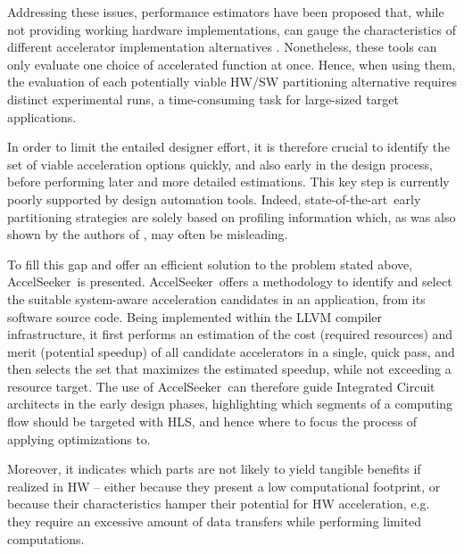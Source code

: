 \documentclass[]{usiinfthesis}
\newcommand{\aseeker}{{AccelSeeker}}
\newcommand{\SoTA}{{state-of-the-art}}
\begin{document}
Addressing these issues, performance estimators have been proposed
that, while not providing working hardware implementations, can gauge
the characteristics of different accelerator implementation
alternatives  \cite{ShaoOct16} \cite{KathailFeb16}.  
Nonetheless, these tools can only evaluate one choice of accelerated
function at once. Hence, when using them, the evaluation of each
potentially viable HW/SW partitioning alternative requires
distinct experimental runs, a time-consuming task for large-sized
target applications.\par

In order to limit the entailed designer effort, it is therefore crucial to identify the set of viable 
acceleration options quickly, and also early in the design process, before performing later and more 
detailed estimations. This key step is currently poorly supported by design automation tools. Indeed, 
\SoTA\ early partitioning strategies are solely based on profiling information \cite{XilinxESTRef18} 
\cite{LattnerMar04} which, as was also shown by the authors of \cite{SyrowikJun18}, may often be 
misleading.\par

To fill this gap and offer an efficient solution to the problem stated above, \aseeker\ is presented. 
\aseeker\ offers a methodology to identify and select the suitable system-aware acceleration candidates in an
application, from its software source code. Being implemented within the LLVM \cite{LattnerMar04} compiler 
infrastructure, it first performs an estimation of the cost (required resources) and merit (potential speedup) 
of all candidate accelerators in a single, quick pass, and then selects the set that maximizes the estimated 
speedup, while not exceeding a resource target. The use of \aseeker\ can therefore guide Integrated Circuit 
architects in the early design phases, highlighting which segments of a computing flow should be
targeted with HLS, and hence where to focus the process of applying optimizations to.\par

Moreover, it indicates which parts are not likely to yield tangible benefits if realized in HW -- either 
because they present a low computational footprint, or because their characteristics hamper their potential for HW 
acceleration, e.g. they require an excessive amount of data transfers while performing limited computations.\par
\end{document}
